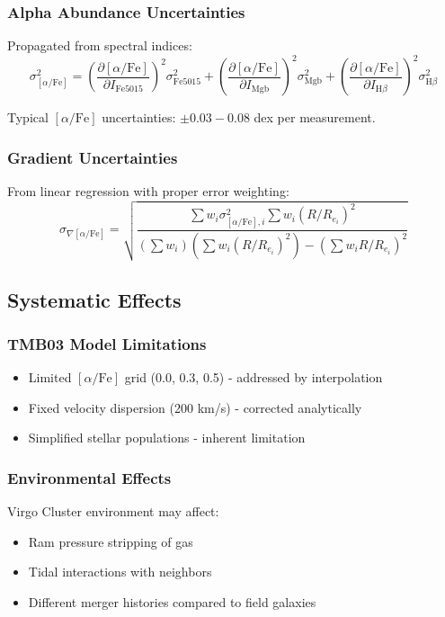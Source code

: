 \documentclass[12pt,a4paper]{article}
\newcommand{\alphaFe}{[\alpha/\text{Fe}]}
\newcommand{\RRe}{R/R_e}
\begin{document}
\subsubsection{Alpha Abundance Uncertainties}
Propagated from spectral indices:
\begin{equation}
\sigma_{\alphaFe}^2 = \left(\frac{\partial \alphaFe}{\partial I_{\text{Fe5015}}}\right)^2 \sigma_{\text{Fe5015}}^2 + \left(\frac{\partial \alphaFe}{\partial I_{\text{Mgb}}}\right)^2 \sigma_{\text{Mgb}}^2 + \left(\frac{\partial \alphaFe}{\partial I_{\text{H}\beta}}\right)^2 \sigma_{\text{H}\beta}^2
\end{equation}

Typical $\alphaFe$ uncertainties: $\pm 0.03-0.08$ dex per measurement.

\subsubsection{Gradient Uncertainties}
From linear regression with proper error weighting:
\begin{equation}
\sigma_{\nabla\alphaFe} = \sqrt{\frac{\sum w_i \sigma_{\alphaFe,i}^2 \sum w_i (\RRe_i)^2}{(\sum w_i)(\sum w_i (\RRe_i)^2) - (\sum w_i \RRe_i)^2}}
\end{equation}

\subsection{Systematic Effects}

\subsubsection{TMB03 Model Limitations}
\begin{itemize}
    \item Limited $\alphaFe$ grid (0.0, 0.3, 0.5) - addressed by interpolation
    \item Fixed velocity dispersion (200 km/s) - corrected analytically
    \item Simplified stellar populations - inherent limitation
\end{itemize}

\subsubsection{Environmental Effects}
Virgo Cluster environment may affect:
\begin{itemize}
    \item Ram pressure stripping of gas
    \item Tidal interactions with neighbors
    \item Different merger histories compared to field galaxies
\end{itemize}
\end{document}
